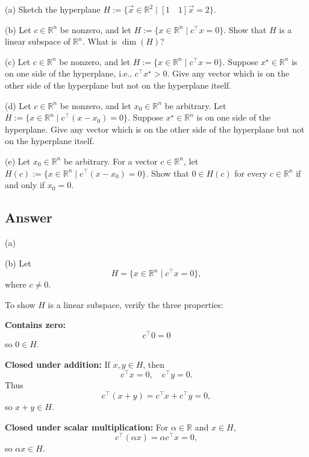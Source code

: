 \documentclass[
	12pt,
]{fphw}
\begin{document}
(a) Sketch the hyperplane \(H := \{\vec x \in \mathbb{R}^2 \mid [1\quad 1]\vec x = 2\}\).

(b) Let \(c \in \mathbb{R}^n\) be nonzero, and let \(H := \{x \in \mathbb{R}^n \mid c^\top x = 0\}\).
Show that \(H\) is a linear subspace of \(\mathbb{R}^n\). What is \(\dim(H)\)?

(c) Let \(c \in \mathbb{R}^n\) be nonzero, and let \(H := \{x \in \mathbb{R}^n \mid c^\top x = 0\}\).
Suppose \(x^\star \in \mathbb{R}^n\) is on one side of the hyperplane, i.e., \(c^\top x^\star > 0\).
Give any vector which is on the other side of the hyperplane but not on the hyperplane itself.

(d) Let \(c \in \mathbb{R}^n\) be nonzero, and let \(x_0 \in \mathbb{R}^n\) be arbitrary.
Let \(H := \{x \in \mathbb{R}^n \mid c^\top (x - x_0) = 0\}\).
Suppose \(x^\star \in \mathbb{R}^n\) is on one side of the hyperplane.
Give any vector which is on the other side of the hyperplane but not on the hyperplane itself.

(e) Let \(x_0 \in \mathbb{R}^n\) be arbitrary. For a vector \(c \in \mathbb{R}^n\), let
\(H(c) := \{x \in \mathbb{R}^n \mid c^\top (x - x_0) = 0\}\).
Show that \(0 \in H(c)\) for every \(c \in \mathbb{R}^n\) if and only if \(x_0 = 0\).

\subsection*{Answer}

(a)
\begin{center}
\end{center}

(b) Let
\[
H = \{x \in \mathbb{R}^n \mid c^\top x = 0\},
\]
where $c \neq 0$.

To show $H$ is a linear subspace, verify the three properties:

\textbf{Contains zero:}
\[
c^\top 0 = 0
\]
so $0 \in H$.

\textbf{Closed under addition:}  
If $x,y \in H$, then
\[
c^\top x = 0, \quad c^\top y = 0.
\]
Thus
\[
c^\top (x+y) = c^\top x + c^\top y = 0,
\]
so $x+y \in H$.

\textbf{Closed under scalar multiplication:}  
For $\alpha \in \mathbb{R}$ and $x \in H$,
\[
c^\top (\alpha x) = \alpha c^\top x = 0,
\]
so $\alpha x \in H$.
\end{document}

